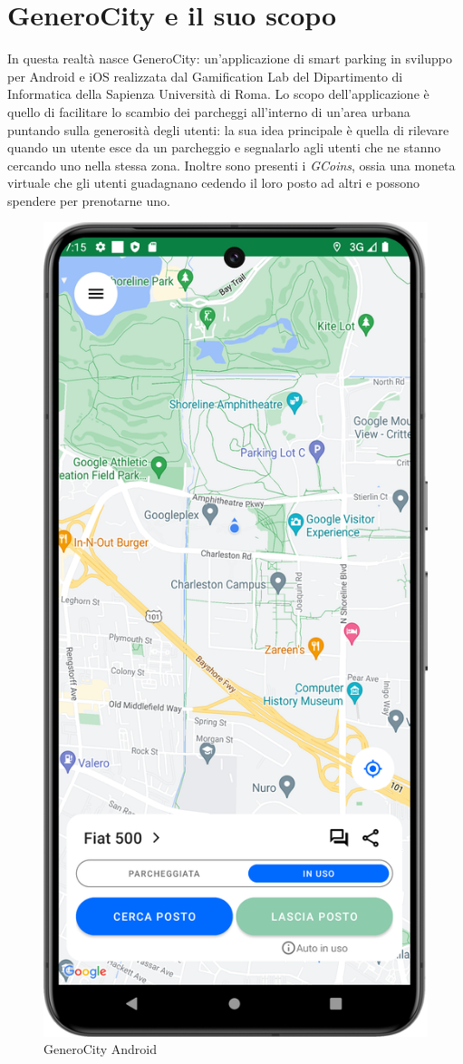 \section{GeneroCity e il suo scopo}
In questa realtà nasce GeneroCity: un’applicazione di smart parking in sviluppo per Android e iOS realizzata dal Gamification Lab del Dipartimento di Informatica della Sapienza Università di Roma. Lo scopo dell'applicazione è quello di facilitare lo scambio dei parcheggi all’interno di un’area urbana puntando sulla generosità degli utenti\cite{ref:generocity}: la sua idea principale è quella di rilevare quando un utente esce da un parcheggio e segnalarlo agli utenti che ne stanno cercando uno nella stessa zona. Inoltre sono presenti i \textit{GCoins}, ossia una moneta virtuale che gli utenti guadagnano cedendo il loro posto ad altri e possono spendere per prenotarne uno. 
\begin{figure}
    \centering
    \includegraphics[width=0.9\linewidth]{images/gc_main_activity.png}
    \caption{GeneroCity Android}
    \label{fig:main_screen}
\end{figure}
